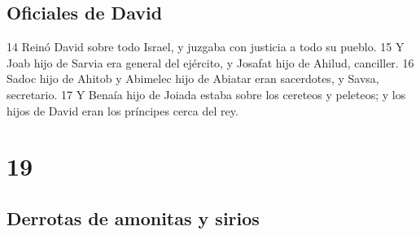 \section*{Oficiales de David}

 
14 Reinó David sobre todo Israel, y juzgaba con justicia a todo su pueblo.
15 Y Joab hijo de Sarvia era general del ejército, y Josafat hijo de Ahilud, canciller.
16 Sadoc hijo de Ahitob y Abimelec hijo de Abiatar eran sacerdotes, y Savsa, secretario.
17 Y Benaía hijo de Joiada estaba sobre los cereteos y peleteos; y los hijos de David eran los príncipes cerca del rey. 

\chapter{19}

\section*{Derrotas de amonitas y sirios }

 


